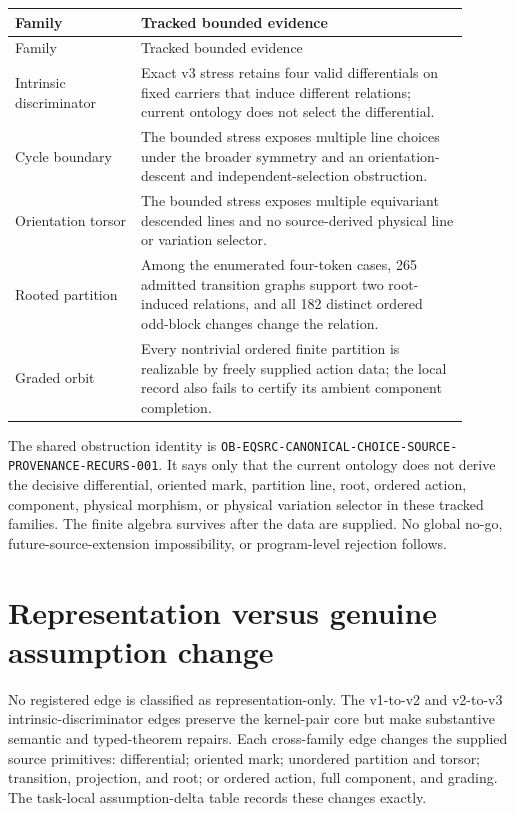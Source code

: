 \documentclass[11pt]{article}
\begin{document}
\begin{longtable}{p{0.25\linewidth}p{0.65\linewidth}}
\toprule
Family & Tracked bounded evidence \\
\midrule
\endfirsthead
\toprule
Family & Tracked bounded evidence \\
\midrule
\endhead
Intrinsic discriminator & Exact v3 stress retains four valid differentials
on fixed carriers that induce different relations; current ontology does not
select the differential. \\
Cycle boundary & The bounded stress exposes multiple line choices under the
broader symmetry and an orientation-descent and independent-selection
obstruction. \\
Orientation torsor & The bounded stress exposes multiple equivariant
descended lines and no source-derived physical line or variation selector. \\
Rooted partition & Among the enumerated four-token cases, 265 admitted
transition graphs support two root-induced relations, and all 182 distinct
ordered odd-block changes change the relation. \\
Graded orbit & Every nontrivial ordered finite partition is realizable by
freely supplied action data; the local record also fails to certify its
ambient component completion. \\
\bottomrule
\end{longtable}

The shared obstruction identity is
\texttt{OB-EQSRC-CANONICAL-CHOICE-SOURCE-PROVENANCE-RECURS-001}.
It says only that the current ontology does not derive the decisive
differential, oriented mark, partition line, root, ordered action, component,
physical morphism, or physical variation selector in these tracked families.
The finite algebra survives after the data are supplied. No global no-go,
future-source-extension impossibility, or program-level rejection follows.

\section{Representation versus genuine assumption change}

No registered edge is classified as representation-only. The v1-to-v2 and
v2-to-v3 intrinsic-discriminator edges preserve the kernel-pair core but make
substantive semantic and typed-theorem repairs. Each cross-family edge changes
the supplied source primitives: differential; oriented mark; unordered
partition and torsor; transition, projection, and root; or ordered action,
full component, and grading. The task-local assumption-delta table records
these changes exactly.
\end{document}

